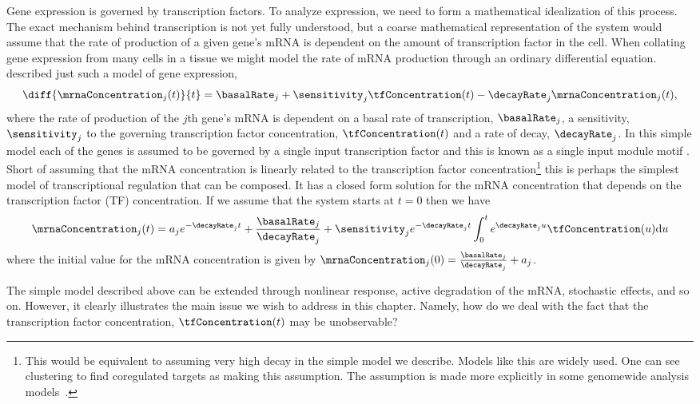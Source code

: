 \documentclass{article}
\begin{document}
Gene expression is governed by transcription factors. To analyze
expression, we need to form a mathematical idealization of this
process. The exact mechanism behind transcription is not yet fully
understood, but a coarse mathematical representation of the system
would assume that the rate of production of a given gene's mRNA is
dependent on the amount of transcription factor in the cell. When
collating gene expression from many cells in a tissue we might model
the rate of mRNA production through an ordinary differential
equation. \cite{Barenco:ranked06} described just such a model of gene
expression,
\begin{equation}
\diff{\mrnaConcentration_j(t)}{t} = \basalRate_j + \sensitivity_j \tfConcentration(t) -\decayRate_j \mrnaConcentration_j(t), \label{eq:differentialEquation}
\end{equation}
where the rate of production of the $j$th gene's mRNA is dependent on
a basal rate of transcription, $\basalRate_j$, a sensitivity,
$\sensitivity_j$ to the governing transcription factor concentration,
$\tfConcentration(t)$ and a rate of decay, $\decayRate_j$. In this
simple model each of the genes is assumed to be governed by a
single input transcription factor and this is known as a single input
module motif \citep{Alon:systems06}. Short of assuming that the mRNA
concentration is linearly related to the transcription factor
concentration\footnote{This would be equivalent to assuming very high
  decay in the simple model we describe. Models like this
  are widely used. One can see clustering to find coregulated targets
  as making this assumption. The assumption is made more explicitly in
  some genomewide analysis models~\citep[e.g.][]{Sanguinetti:chipvar06,Sanguinetti:chipdyno06}.} this is
perhaps the simplest model of transcriptional regulation that can be
composed. It has a closed form solution for the mRNA concentration
that depends on the transcription factor (TF) concentration. If we assume that the system
starts at $t=0$ then we have
\begin{equation}
\mrnaConcentration_j(t) = a_je^{-\decayRate_{j}t} +
\frac{\basalRate_j}{\decayRate_j} +
\sensitivity_je^{-\decayRate_{j}t}\int_0^t
e^{\decayRate_{j}u}\tfConcentration(u) \mathrm{d}u 
\label{eq:differentialEquationSoln}
\end{equation}
where the initial value for the mRNA concentration is given by
$\mrnaConcentration_j(0)=\frac{\basalRate_j}{\decayRate_j}+a_j$.

The simple model described above can be extended through nonlinear
response, active degradation of the mRNA, stochastic effects, and so
on. However, it clearly illustrates the main issue we wish to address
in this chapter. Namely, how do we deal with the fact that the
transcription factor concentration, $\tfConcentration(t)$ may be
unobservable? 
\end{document}
